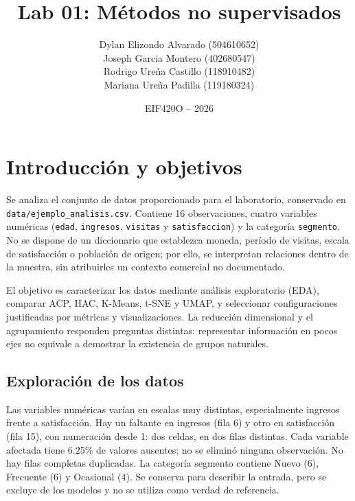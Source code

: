 \documentclass[11pt]{article}
\title{Lab 01: Métodos no supervisados}
\author{Dylan Elizondo Alvarado (504610652)\\
Joseph Garcia Montero (402680547)\\
Rodrigo Ureña Castillo (118910482)\\
Mariana Ureña Padilla (119180324)}
\date{EIF420O -- 2026}
\begin{document}
\maketitle

\section{Introducción y objetivos}
Se analiza el conjunto de datos proporcionado para el laboratorio,
conservado en \texttt{data/ejemplo\_analisis.csv}. Contiene 16 observaciones,
cuatro variables numéricas (\texttt{edad}, \texttt{ingresos},
\texttt{visitas} y \texttt{satisfaccion}) y la categoría \texttt{segmento}.
No se dispone de un diccionario que establezca moneda, período de visitas,
escala de satisfacción o población de origen; por ello, se interpretan
relaciones dentro de la muestra, sin atribuirles un contexto comercial no
documentado.

El objetivo es caracterizar los datos mediante análisis exploratorio (EDA),
comparar ACP, HAC, K-Means, t-SNE y UMAP, y seleccionar configuraciones
justificadas por métricas y visualizaciones. La reducción dimensional y el
agrupamiento responden preguntas distintas: representar información en pocos
ejes no equivale a demostrar la existencia de grupos naturales.

\subsection{Exploración de los datos}
Las variables numéricas varían en escalas muy distintas, especialmente
ingresos frente a satisfacción. Hay un faltante en ingresos (fila 6) y otro
en satisfacción (fila 15), con numeración desde 1: dos celdas, en dos filas
distintas. Cada variable afectada tiene 6.25\% de valores ausentes; no se
eliminó ninguna observación. No hay filas completas duplicadas.
La categoría segmento contiene Nuevo (6), Frecuente (6) y Ocasional (4).
Se conserva para describir la entrada, pero se excluye de los modelos y no
se utiliza como verdad de referencia.
\end{document}
